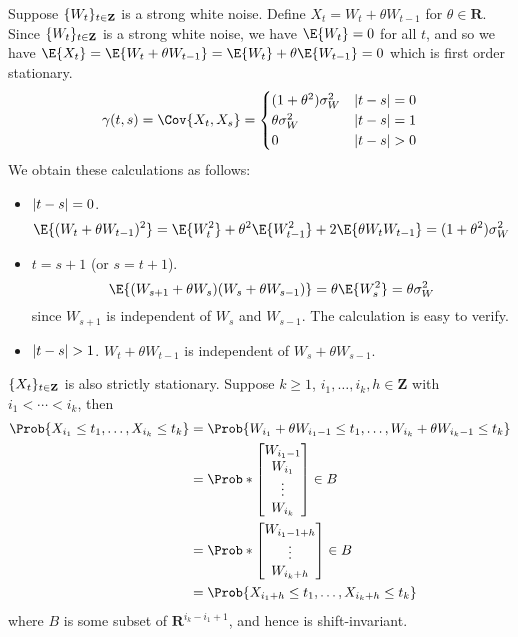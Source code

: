 \begin{Example}{}{}
    Suppose $ \{W_t\}_{t\in\mathbf{Z}} $ is a strong white noise.
    Define $ X_t=W_t+\theta W_{t-1} $ for $ \theta\in\mathbf{R} $.
    Since $ \{W_t\}_{t\in\mathbf{Z}} $ is a strong white noise, we
    have $ \E{W_t}=0 $ for all $ t $, and so we
    have $ \E{X_t}=\E{W_t+\theta W_{t-1}}=\E{W_t}+\theta\E{W_{t-1}}=0 $
    which is first order stationary.
    \[ \gamma(t,s)=\Cov{X_t,X_s}=\begin{cases}
            (1+\theta^2)\sigma_W^2 & \abs{t-s}=0 \\
            \theta\sigma_W^2       & \abs{t-s}=1 \\
            0                      & \abs{t-s}>0
        \end{cases} \]
    We obtain these calculations as follows:
    \begin{itemize}
        \item $ \lvert t-s\rvert=0 $.
              \[ \E{(W_t+\theta W_{t-1})^2}
                  =\E{W_t^2}+\theta^2\E{W_{t-1}^2}+2\E{\theta W_t W_{t-1}}
                  =(1+\theta^2)\sigma_W^2 \]
        \item $ t=s+1 $ (or $ s=t+1 $).
              \[ \E{(W_{s+1}+\theta W_s)(W_s+\theta W_{s-1})}=\theta\E{W_s^2}=\theta\sigma_W^2 \]
              since $ W_{s+1} $ is independent of $ W_s $ and $ W_{s-1} $.
              The calculation is easy to verify.
        \item $ \lvert t-s\rvert>1 $. $ W_t+\theta W_{t-1} $ is independent of
              $ W_s+\theta W_{s-1} $.
    \end{itemize}
    $ \{X_t\}_{t\in\mathbf{Z}} $ is also strictly stationary.
    Suppose $ k\ge 1 $, $ i_1,\ldots,i_k, h\in\mathbf{Z} $
    with $ i_1<\cdots<i_k $, then
    \begin{align*}
        \Prob{X_{i_1}\le t_1,\ldots,X_{i_k}\le t_k}
         & =\Prob{W_{i_1}+\theta W_{{i_1}-1}\le t_1,\ldots,W_{i_k}+\theta W_{{i_k}-1}\le t_k} \\
         & =\Prob*{\begin{bmatrix}
                W_{{i_1}-1} \\
                W_{i_1}     \\
                \vdots      \\
                W_{i_k}
            \end{bmatrix}\in B}                                           \\
         & =\Prob*{\begin{bmatrix}
                W_{{i_1-1}+h} \\
                \vdots        \\
                W_{{i_k}+h}
            \end{bmatrix}\in B}                                           \\
         & =\Prob{X_{{i_1}+h}\le t_1,\ldots,X_{{i_k}+h}\le t_k}
    \end{align*}
    where $ B $ is some subset of $ \mathbf{R}^{i_k-i_1+1} $, and hence
    is shift-invariant.
\end{Example}
